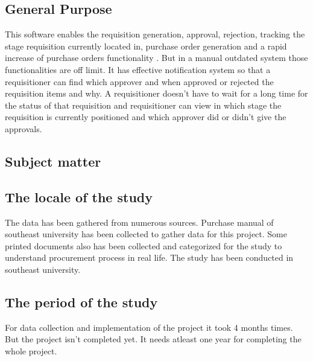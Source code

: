 \documentclass[12pt]{report} %
\begin{document}
\subsection{General Purpose}
This software enables the requisition generation, approval, rejection, tracking the stage requisition currently located in, purchase order generation and a rapid increase of purchase orders functionality . But in a manual outdated system those functionalities are off limit. It has effective notification system so that a requisitioner can find which approver and when approved or rejected the requisition items and why. A requisitioner doesn't have to wait for a long time for the status of that requisition and requisitioner can view in which stage the requisition is currently positioned and which approver did or didn't give the approvals.

\subsection{Subject matter}
\subsection{The locale of the study}
The data has been gathered from numerous sources. Purchase manual of southeast university has been collected to gather data for this project. Some printed documents also has been collected and categorized for the study to understand procurement process in real life. The study has been conducted in southeast university.

\subsection{The period of the study}
For data collection and implementation of the project it took 4 months times. But the project isn't completed yet. It needs atleast one year for completing the whole project.


\fi  %










\clearpage

\end{document}
